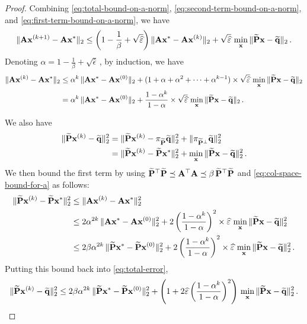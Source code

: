 \begin{proof}
Combining \eqref{eq:total-bound-on-a-norm}, \eqref{eq:second-term-bound-on-a-norm}, and \eqref{eq:first-term-bound-on-a-norm}, we have
\[
    \norm{\mat{A}\mat{x}^{(k+1)} - \mat{A}\mat{x}^*}_2
    \leq
    \parens*{1-\frac{1}{\beta} + \sqrt{\widehat{\epsilon}}}\, \norm{\mat{A} \mat{x}^{*} - \mat{A} \mat{x}^{(k)}}_2 + \sqrt{\widehat{\epsilon}}\, \min_{\mat{x}}\, \norm{\widetilde{\mat{P}} \mat{x}-\widetilde{\mat{q}}}_2\,.
\]
Denoting $\alpha=1-\frac{1}{\beta} + \sqrt{\widehat{\epsilon}}\,$, by induction, we have
\begin{align}
\nonumber
\lVert\mathbf{A}\mathbf{x}^{(k)} - \mathbf{A}\mathbf{x}^*\rVert_2 
& \leq 
\alpha^k\, \lVert\mathbf{A} \mathbf{x}^{*} - \mathbf{A} \mathbf{x}^{(0)}\rVert_2 + (1+\alpha+\alpha^2 + \cdots + \alpha^{k-1}) \times \sqrt{\widehat{\varepsilon}}\,\min_{\mathbf{x}}\, \lVert\widetilde{\mathbf{P}} \mathbf{x}-\widetilde{\mathbf{q}}\rVert_2
\\ & =
\label{eq:col-space-bound-for-a}
\alpha^k\, \lVert\mathbf{A} \mathbf{x}^{*} - \mathbf{A} \mathbf{x}^{(0)}\rVert_2 + \frac{1-\alpha^k}{1-\alpha}\times \sqrt{\widehat{\varepsilon}}\, \min_{\mathbf{x}}\, \lVert\widetilde{\mathbf{P}} \mathbf{x}-\widetilde{\mathbf{q}}\rVert_2\,.
\end{align}

We also have
\begin{align}
\nonumber
\lVert\widetilde{\mathbf{P}} \mathbf{x}^{(k)}-\widetilde{\mathbf{q}}\rVert_2^2 
&= \lVert\widetilde{\mathbf{P}} \mathbf{x}^{(k)} - \pi_{\widetilde{\mathbf{P}}}\widetilde{\mathbf{q}}\rVert_2^2 + \lVert\pi_{\widetilde{\mathbf{P}}^\perp}\widetilde{\mathbf{q}}\rVert_2^2
\\ & = 
\label{eq:total-error}
\lVert\widetilde{\mathbf{P}} \mathbf{x}^{(k)}-\widetilde{\mathbf{P}} \mathbf{x}^*\rVert_2^2 + \min_{\mathbf{x}}\, \lVert\widetilde{\mathbf{P}} \mathbf{x} - \widetilde{\mathbf{q}}\rVert_2^2\,.
\end{align}
We then bound the first term by using $\widetilde{\mathbf{P}}^\top \widetilde{\mathbf{P}} \preceq \mathbf{A}^\top \mathbf{A} \preceq \beta\, \widetilde{\mathbf{P}}^\top \widetilde{\mathbf{P}}$ and \eqref{eq:col-space-bound-for-a} as follows:
\begin{align}
    \nonumber
    \norm{\widetilde{\mat{P}} \mat{x}^{(k)}-\widetilde{\mat{P}} \mat{x}^*}_2^2 
    &\leq
    \norm{\mat{A} \mat{x}^{(k)}-\mat{A} \mat{x}^*}_2^2 \\
    &\leq
    \nonumber
    2\alpha^{2k}\, \norm{\mat{A} \mat{x}^{*} - \mat{A} \mat{x}^{(0)}}_2^2 + 2\, \parens*{\frac{1-\alpha^k}{1-\alpha}}^2 \times \widehat{\epsilon}\, \min_{\mat{x}}\, \norm{\widetilde{\mat{P}} \mat{x}-\widetilde{\mat{q}}}_2^2 \\
    &\leq 
    \nonumber
    2 \beta\alpha^{2k}\, \norm{\widetilde{\mat{P}} \mat{x}^{*} - \widetilde{\mat{P}} \mat{x}^{(0)}}_2^2 + 2\, \parens*{\frac{1-\alpha^k}{1-\alpha}}^2 \times \widehat{\epsilon}\, \min_{\mat{x}}\, \norm{\widetilde{\mat{P}} \mat{x}-\widetilde{\mat{q}}}_2^2\,.
\end{align}
Putting this bound back into \eqref{eq:total-error},
\[
\norm{\widetilde{\mat{P}} \mat{x}^{(k)}-\widetilde{\mat{q}}}_2^2 \leq 2 \beta\alpha^{2k}\, \norm{\widetilde{\mat{P}} \mat{x}^{*} - \widetilde{\mat{P}} \mat{x}^{(0)}}_2^2 + \parens*{1 + 2\widehat{\epsilon}\, \parens*{\frac{1-\alpha^k}{1-\alpha}}^2}\, \min_{\mat{x}}\, \norm{\widetilde{\mat{P}} \mat{x}-\widetilde{\mat{q}}}_2^2\,.
\]


\end{proof}
